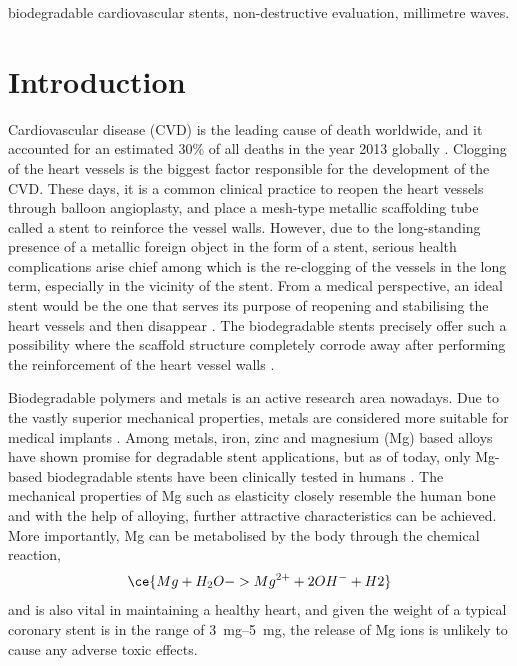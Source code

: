 \documentclass[conference,a4paper]{IEEEtran}
\begin{document}
\begin{IEEEkeywords}
biodegradable cardiovascular stents, non-destructive evaluation, millimetre waves.
\end{IEEEkeywords}

%
\IEEEpeerreviewmaketitle

\vspace{7pt}
\section{Introduction}
Cardiovascular disease (CVD) is the leading cause of death worldwide, and it accounted for an estimated 30\% of all deaths in the year 2013 globally \cite{benjamin_heart_2017}. Clogging of the heart vessels is the biggest factor responsible for the development of the CVD. These days, it is a common clinical practice to reopen the heart vessels through balloon angioplasty, and place a mesh-type metallic scaffolding tube called a stent to reinforce the vessel walls.  However, due to the long-standing presence of a metallic foreign object in the form of a stent, serious health complications arise chief among which is the re-clogging of the vessels in the long term, especially in the vicinity of the stent. From a medical perspective, an ideal stent would be the one that serves its purpose of reopening and stabilising the heart vessels and then disappear \cite{waksman_biodegradable_2006}.  The biodegradable stents  precisely offer such a possibility where the scaffold structure completely corrode away after performing the reinforcement of the heart vessel walls \cite{hou_review_2016}.

Biodegradable polymers and metals is an active research area nowadays. Due to the vastly superior mechanical properties, metals are considered more suitable for medical implants \cite{chen_recent_2014}. Among metals, iron, zinc and magnesium (Mg) based alloys have shown promise for degradable stent applications, but as of today, only Mg-based biodegradable stents have been clinically tested in humans \cite{staiger_magnesium_2006,esmaily_fundamentals_2017}. The mechanical properties of Mg such as elasticity closely resemble the human bone \cite{hermawan2018updates} and with the help of alloying, further attractive characteristics can be achieved. More importantly, Mg can be metabolised by the body through the chemical reaction,
%
\begin{align} \notag
  \ce{Mg + H_2O -> Mg^{2+} + 2OH^{-} + H2}
\end{align}
%
and is also vital in maintaining a healthy heart, and given the weight of a typical
coronary stent is in the range of \SIrange{3}{5}{\mg}, the release of Mg ions is unlikely to cause any adverse toxic effects.
\end{document}
